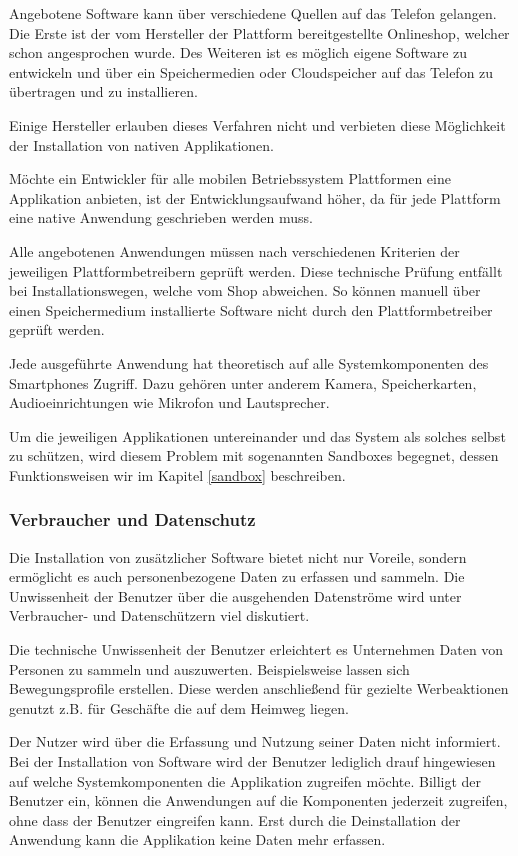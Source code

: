 Angebotene Software kann über verschiedene Quellen auf das Telefon gelangen. Die Erste ist der vom Hersteller der Plattform bereitgestellte Onlineshop, welcher schon angesprochen wurde. Des Weiteren ist es möglich eigene Software zu entwickeln und über ein Speichermedien oder Cloudspeicher auf das Telefon zu übertragen und zu installieren.

Einige Hersteller erlauben dieses Verfahren nicht und verbieten diese Möglichkeit der Installation von nativen Applikationen.

Möchte ein Entwickler für alle mobilen Betriebssystem Plattformen eine Applikation anbieten, ist der Entwicklungsaufwand höher, da für jede Plattform eine native Anwendung geschrieben werden muss.

Alle angebotenen Anwendungen müssen nach verschiedenen Kriterien der jeweiligen Plattformbetreibern geprüft werden. Diese technische Prüfung entfällt bei Installationswegen, welche vom Shop abweichen. So können manuell über einen Speichermedium installierte Software nicht durch den Plattformbetreiber geprüft werden.

Jede ausgeführte Anwendung hat theoretisch auf alle Systemkomponenten des Smartphones Zugriff. Dazu gehören unter anderem Kamera, Speicherkarten, Audioeinrichtungen wie Mikrofon und Lautsprecher.

Um die jeweiligen Applikationen untereinander und das System als solches selbst zu schützen, wird diesem Problem mit sogenannten Sandboxes begegnet, dessen Funktionsweisen wir im Kapitel \ref{sandbox} beschreiben.

\subsubsection{Verbraucher und Datenschutz}

Die Installation von zusätzlicher Software bietet nicht nur Voreile, sondern ermöglicht es auch personenbezogene Daten zu erfassen und sammeln. Die Unwissenheit der Benutzer über die ausgehenden Datenströme wird unter Verbraucher- und Datenschützern viel diskutiert.

Die technische Unwissenheit der Benutzer erleichtert es Unternehmen Daten von Personen zu sammeln und auszuwerten. Beispielsweise lassen sich Bewegungsprofile erstellen. Diese werden anschließend für gezielte Werbeaktionen genutzt z.B. für Geschäfte die auf dem Heimweg liegen.

Der Nutzer wird über die Erfassung und Nutzung seiner Daten nicht informiert. Bei der Installation von Software wird der Benutzer lediglich drauf hingewiesen auf welche Systemkomponenten die Applikation zugreifen möchte. Billigt der Benutzer ein, können die Anwendungen auf die Komponenten jederzeit zugreifen, ohne dass der Benutzer eingreifen kann. Erst durch die Deinstallation der Anwendung kann die Applikation keine Daten mehr erfassen.

